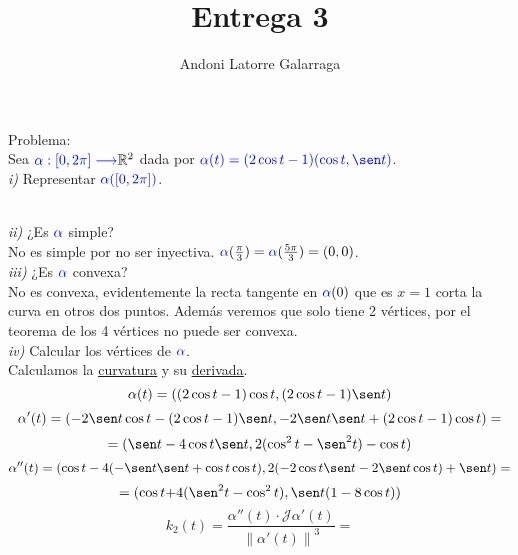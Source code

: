 \documentclass{article}
\title{Entrega 3}
\author{Andoni Latorre Galarraga}
\date{}
\newcommand{\bb}[1]{\mathbb{#1}}
\begin{document}
\maketitle

\textcolor{WildStrawberry}{Problema:}\\
Sea $\textcolor{blue}{\alpha:[0,2\pi] \longrightarrow} \bb{R}^2$ dada por $\textcolor{blue}{\alpha(t)= (2\cos t -1)(\cos t, \sen t)}$.\\
\textit{i)} Representar $\textcolor{blue}{\alpha([0, 2\pi])}$.\\
\\
\textit{ii)} ¿Es $\textcolor{blue}{\alpha}$ simple?\\
No es simple por no ser inyectiva. $\textcolor{blue}{\alpha}(\frac{\pi}{3})=\textcolor{blue}{\alpha}(\frac{5\pi}{3})=(0,0)$.\\
\textit{iii)} ¿Es $\textcolor{blue}{\alpha}$ convexa?\\
No es convexa, evidentemente la recta tangente en $\textcolor{blue}{\alpha}(0)$ que es $x= 1$ corta la curva en otros dos puntos. Además veremos que solo tiene 2 vértices, por el teorema de los 4 vértices no puede ser convexa.\\
\textit{iv)} Calcular los vértices de $\textcolor{blue}{\alpha}$.\\
Calculamos la \href{https://www.wolframalpha.com/input?i=Curvature+of+%28%282cos%28t%29-1%29*cos%28t%29%2C%282cos%28t%29-1%29*sin%28t%29%29}{\textcolor{WildStrawberry}{\underline{curvatura}}} y su \href{https://www.wolframalpha.com/input?i=derivative+%289+-+6+cos%28t%29%29%2F%285+-+4+cos%28t%29%29%5E%283%2F2%29}{\textcolor{WildStrawberry}{\underline{derivada}}}.
$$
\alpha(t) = ((2\cos t -1)\cos t, (2\cos t -1) \sen t)
$$
$$
\alpha'(t) = ( {-2\sen t \cos t - (2\cos t -1)\sen t}, {-2\sen t \sen t + (2\cos t -1)\cos t}) =
$$
$$
= ({\sen t - 4 \cos t \sen t}, {2(\cos^2 t -\sen^2 t)-\cos t})
$$
$$
\alpha''(t) = (\cos t - 4 (-\sen t \sen t + \cos t \cos t), 2(-2\cos t \sen t - 2 \sen t \cos t) + \sen t)=
$$
$$
= (\cos t {+ 4(\sen^2 t - \cos^2 t)}, {\sen t(1 - 8 \cos t)})
$$
$$
k_2(t) = \frac{\alpha''(t) \cdot \mathcal{J}\alpha'(t)}{\left\| \alpha'(t) \right\|^3} =
$$
\end{document}
